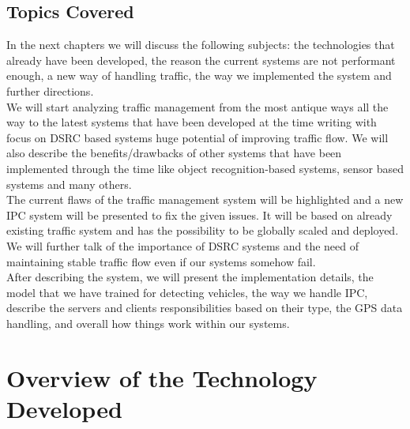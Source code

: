 \documentclass[17pt]{report}
\begin{document}
\section{Topics Covered}
\indent \indent
In the next chapters we will discuss the following subjects: 
the technologies that already have been developed, the reason the 
current systems are not performant enough, a new way of handling 
traffic, the way we implemented the system and further directions. \\
\indent \indent
We will start analyzing traffic management from the most antique ways all the
way to the latest systems that have been developed at the time writing with
focus on DSRC based systems huge potential of improving traffic flow. 
We will also describe the benefits/drawbacks of other systems that have 
been implemented through the time like object recognition-based systems, 
sensor based systems and many others.\\
\indent \indent 
The current flaws of the traffic management system will be highlighted and 
a new IPC system will be presented to fix the given issues. It will be based on 
already existing traffic system and has the possibility to be globally scaled
and deployed. We will further talk of the importance of DSRC systems and the
need of maintaining stable traffic flow even if our systems somehow fail. \\
\indent \indent 
After describing the system, we will present the implementation details, the 
model that we have trained for detecting vehicles, the way we handle IPC, describe 
the servers and clients responsibilities based on their type, the GPS data 
handling, and overall how things work within our systems.

\chapter{Overview of the Technology Developed}
\end{document}
